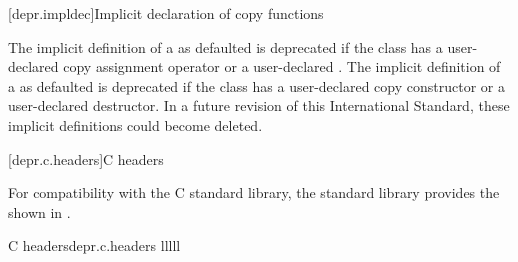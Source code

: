 [depr.impldec]{Implicit declaration of copy functions}

\pnum
The implicit definition of a 
as defaulted is deprecated if the class has
a user-declared copy assignment operator or
a user-declared .
The implicit definition of a 
as defaulted is deprecated if the class has
a user-declared copy constructor or
a user-declared destructor.
In a future revision of this International Standard, these implicit definitions
could become deleted.

[depr.c.headers]{C headers}

\pnum
For compatibility with the
%
C standard library, the \Cpp{} standard library provides
the  shown in .

\begin{multicolfloattable}{C headers}{depr.c.headers}
{lllll}
 \\
 \\
 \\
 \\
 \\
 \\
\columnbreak
{} \\
 \\
 \\
 \\
 \\
 \\
\columnbreak
{} \\
 \\
 \\
 \\
 \\
 \\
\columnbreak
{} \\
 \\
 \\
 \\
 \\
 \\
\columnbreak
{} \\
 \\
\end{multicolfloattable}

